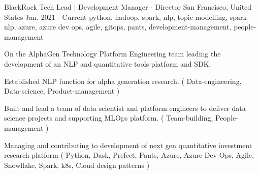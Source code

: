 \cventry
    {BlackRock} %
    {Tech Lead | Development Manager - Director} %
    {San Francisco, United States} %
    {Jan. 2021 - Current} %
    { python, hadoop, spark, nlp, topic modelling, spark-nlp, azure, azure dev ops, agile, gitops, pants, development-management, people-management} %
    {
        On the AlphaGen Technology Platform Engineering team leading the development of an NLP and quantitative tools platform and SDK.
    \begin{cvitems} %
        \item { Established NLP function for alpha generation research. ( Data-engineering, Data-science, Product-management ) }
        \item { Built and lead a team of data scientist and platform engineers to deliver data science projects and supporting MLOps platform. ( Team-building, People-management ) }
        \item { Managing and contributing to development of next gen quantitative investment research platform ( Python, Dask, Prefect, Pants, Azure, Azure Dev Ops, Agile, Snowflake, Spark, k8s, Cloud design patterns ) }
    \end{cvitems}
    }
